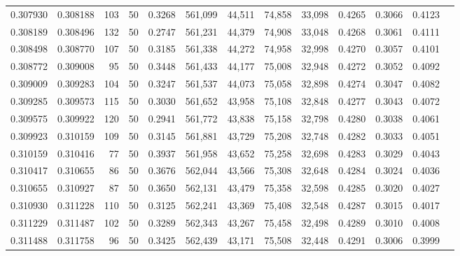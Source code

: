 \begin{tabular}{rrrrrrrrrrrrr}
0.307930 & 0.308188 &   103 &  50 &                                     0.3268 & 561,099 &  44,511 &  74,858 &  33,098 & 0.4265 & 0.3066 & 0.4123 \\
0.308189 & 0.308496 &   132 &  50 &                                     0.2747 & 561,231 &  44,379 &  74,908 &  33,048 & 0.4268 & 0.3061 & 0.4111 \\
0.308498 & 0.308770 &   107 &  50 &                                     0.3185 & 561,338 &  44,272 &  74,958 &  32,998 & 0.4270 & 0.3057 & 0.4101 \\
0.308772 & 0.309008 &    95 &  50 &                                     0.3448 & 561,433 &  44,177 &  75,008 &  32,948 & 0.4272 & 0.3052 & 0.4092 \\
0.309009 & 0.309283 &   104 &  50 &                                     0.3247 & 561,537 &  44,073 &  75,058 &  32,898 & 0.4274 & 0.3047 & 0.4082 \\
0.309285 & 0.309573 &   115 &  50 &                                     0.3030 & 561,652 &  43,958 &  75,108 &  32,848 & 0.4277 & 0.3043 & 0.4072 \\
0.309575 & 0.309922 &   120 &  50 &                                     0.2941 & 561,772 &  43,838 &  75,158 &  32,798 & 0.4280 & 0.3038 & 0.4061 \\
0.309923 & 0.310159 &   109 &  50 &                                     0.3145 & 561,881 &  43,729 &  75,208 &  32,748 & 0.4282 & 0.3033 & 0.4051 \\
0.310159 & 0.310416 &    77 &  50 &                                     0.3937 & 561,958 &  43,652 &  75,258 &  32,698 & 0.4283 & 0.3029 & 0.4043 \\
0.310417 & 0.310655 &    86 &  50 &                                     0.3676 & 562,044 &  43,566 &  75,308 &  32,648 & 0.4284 & 0.3024 & 0.4036 \\
0.310655 & 0.310927 &    87 &  50 &                                     0.3650 & 562,131 &  43,479 &  75,358 &  32,598 & 0.4285 & 0.3020 & 0.4027 \\
0.310930 & 0.311228 &   110 &  50 &                                     0.3125 & 562,241 &  43,369 &  75,408 &  32,548 & 0.4287 & 0.3015 & 0.4017 \\
0.311229 & 0.311487 &   102 &  50 &                                     0.3289 & 562,343 &  43,267 &  75,458 &  32,498 & 0.4289 & 0.3010 & 0.4008 \\
0.311488 & 0.311758 &    96 &  50 &                                     0.3425 & 562,439 &  43,171 &  75,508 &  32,448 & 0.4291 & 0.3006 & 0.3999 \\

\end{tabular}
